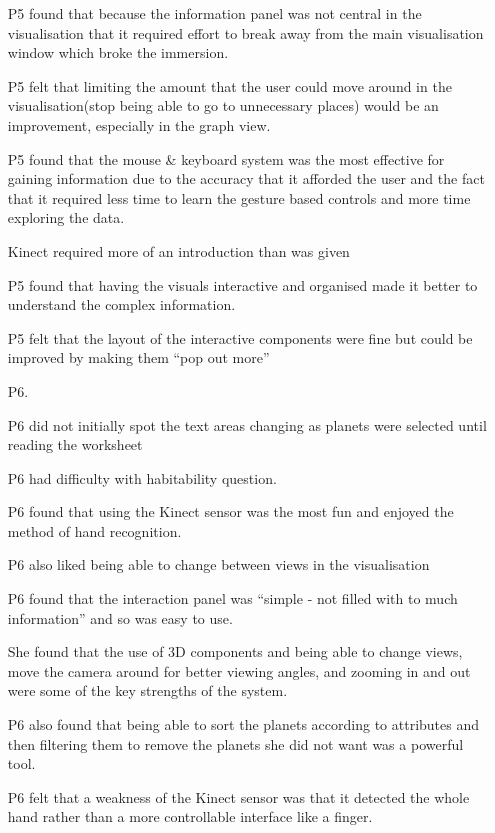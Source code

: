 \begin{enumerate}
    P5 found that because the information panel was not central in the
visualisation that it required effort to break away from the main visualisation
window which broke the immersion.
    
    P5 felt that limiting the amount that the user could move around in the
visualisation(stop being able to go to unnecessary places) would be an
improvement, especially in the graph view.
    
    P5 found that the mouse \& keyboard system was the most effective for
gaining information due to the accuracy that it afforded the user and the fact
that it required less time to learn the gesture based controls and more time
exploring the data.
    
    Kinect required more of an introduction than was given
    
    P5 found that having the visuals interactive and organised made it better to
understand the complex information.
    
    P5 felt that the layout of the interactive components were fine but could be
improved by making them ``pop out more''
    
     \item[P6.]
     
     P6 did not initially spot the text areas changing as planets were selected
until reading the worksheet
     
     P6 had difficulty with habitability question.
     
     P6 found that using the Kinect sensor was the most fun and enjoyed the
method of hand recognition.
     
     P6 also liked being able to change between views in the visualisation
     
     P6 found that the interaction panel was ``simple - not filled with to much
information'' and so was easy to use.
     
     She found that the use of 3D components and being able to change views,
move the camera around for better viewing angles, and zooming in and out were
some of the key strengths of the system.
     
     P6 also found that being able to sort the planets according to attributes
and then filtering them to remove the planets she did not want was a powerful
tool.
     
     P6 felt that a weakness of the Kinect sensor was that it detected the whole
hand rather than a more controllable interface like a finger.
     

\end{enumerate}
